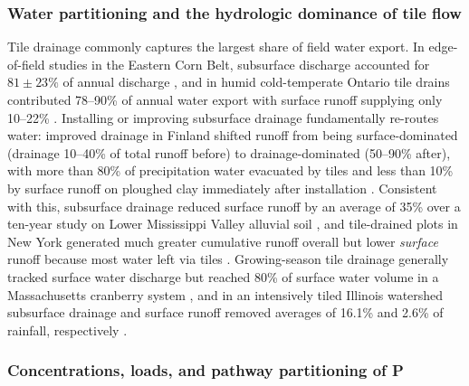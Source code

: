 \subsubsection{Water partitioning and the hydrologic dominance of tile flow}

Tile drainage commonly captures the largest share of field water export. In
edge-of-field studies in the Eastern Corn Belt, subsurface discharge accounted for
$81 \pm 23\%$ of annual discharge \parencite{Pease2018}, and in humid
cold-temperate Ontario tile drains contributed 78--90\% of annual water export
with surface runoff supplying only 10--22\% \parencite{VanEsbroeck2016}. Installing
or improving subsurface drainage fundamentally re-routes water: improved drainage
in Finland shifted runoff from being surface-dominated (drainage 10--40\% of total
runoff before) to drainage-dominated (50--90\% after), with more than 80\% of
precipitation water evacuated by tiles and less than 10\% by surface runoff on
ploughed clay immediately after installation \parencite{Turtola1995}. Consistent
with this, subsurface drainage reduced surface runoff by an average of 35\% over a
ten-year study on Lower Mississippi Valley alluvial soil \parencite{BENGTSON1995},
and tile-drained plots in New York generated much greater cumulative runoff overall
but lower \emph{surface} runoff because most water left via tiles
\parencite{Klaiber2020}. Growing-season tile drainage generally tracked surface
water discharge but reached 80\% of surface water volume in a Massachusetts
cranberry system \parencite{Millar2025}, and in an intensively tiled Illinois
watershed subsurface drainage and surface runoff removed averages of 16.1\% and
2.6\% of rainfall, respectively \parencite{Algoazany2007}.

\subsubsection{Concentrations, loads, and pathway partitioning of P}

